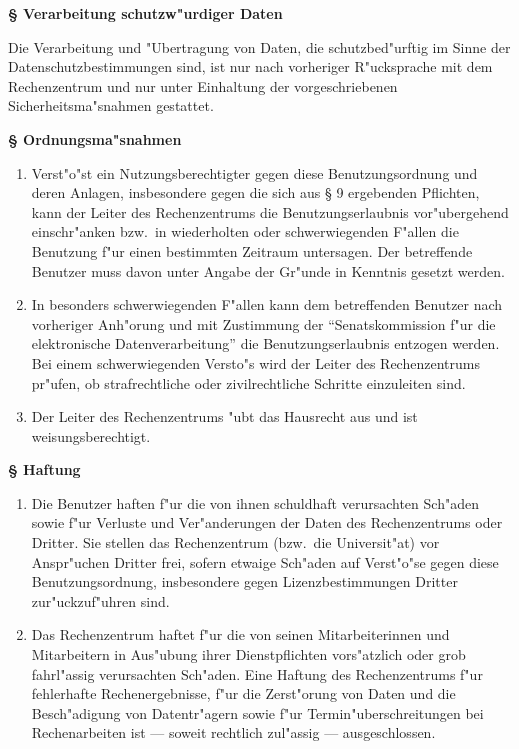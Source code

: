 \documentclass[12pt,titlepage,twoside]{scrartcl}
\newcounter{para_nr}
\newcommand{\Paragraph}[1]{{\large\bf\S{}\sf\textbf{\/\stepcounter{para_nr}\arabic{para_nr} #1}}}
\begin{document}
\begin{appendix}
\Paragraph{Verarbeitung schutzw"urdiger Daten}

Die Verarbeitung und "Ubertragung von Daten, die schutzbed"urftig
im Sinne der Datenschutzbestimmungen sind, ist nur nach vorheriger R"ucksprache
mit dem Rechenzentrum und nur unter Einhaltung der vorgeschriebenen
Sicherheitsma"snahmen gestattet.

\Paragraph{Ordnungsma"snahmen}

\begin{enumerate}
  \item Verst"o"st ein Nutzungsberechtigter gegen diese
    Benutzungsordnung und deren Anlagen, insbesondere gegen die sich aus
    \S{} 9 ergebenden Pflichten, kann der Leiter des Rechenzentrums die
    Benutzungserlaubnis vor"ubergehend einschr"anken bzw.\  in
    wiederholten oder schwerwiegenden F"allen die Benutzung f"ur
    einen bestimmten Zeitraum untersagen. Der betreffende Benutzer
    muss davon unter Angabe der Gr"unde in Kenntnis gesetzt werden.

  \item In besonders schwerwiegenden F"allen kann dem betreffenden Benutzer
    nach vorheriger Anh"orung und mit Zustimmung der "`Senatskommission
    f"ur die elektronische Datenverarbeitung"' die Benutzungserlaubnis
    entzogen werden. Bei einem schwerwiegenden Versto"s wird der
    Leiter des Rechenzentrums pr"ufen, ob strafrechtliche oder
    zivilrechtliche Schritte einzuleiten sind.

  \item Der Leiter des Rechenzentrums "ubt das Hausrecht aus und ist
    weisungsberechtigt.
\end{enumerate}

\Paragraph{Haftung}

\begin{enumerate}
  \item Die Benutzer haften f"ur die von ihnen schuldhaft verursachten
    Sch"aden sowie f"ur Verluste und Ver"anderungen der Daten
    des Rechenzentrums oder Dritter. Sie stellen das Rechenzentrum (bzw.\ 
    die Universit"at) vor Anspr"uchen Dritter frei, sofern etwaige
    Sch"aden auf Verst"o"se gegen diese Benutzungsordnung,
    insbesondere gegen Lizenzbestimmungen Dritter zur"uckzuf"uhren
    sind.

  \item Das Rechenzentrum haftet f"ur die von seinen Mitarbeiterinnen und
    Mitarbeitern in Aus"ubung ihrer Dienstpflichten vors"atzlich
    oder grob fahrl"assig verursachten Sch"aden. Eine Haftung des
    Rechenzentrums f"ur fehlerhafte Rechenergebnisse, f"ur die
    Zerst"orung von Daten und die Besch"adigung von Datentr"agern
    sowie f"ur Termin"uberschreitungen bei Rechenarbeiten ist ---
    soweit rechtlich zul"assig --- ausgeschlossen.
\end{enumerate}


\end{appendix}
\end{document}
